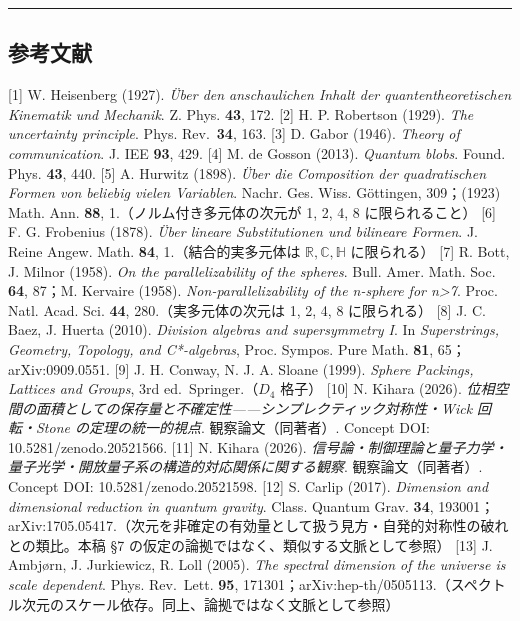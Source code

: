 \documentclass[
]{ltjsarticle}
\begin{document}
\begin{center}\rule{0.5\linewidth}{0.5pt}\end{center}

\subsection{参考文献}\label{ux53c2ux8003ux6587ux732e}

{[}1{]} W. Heisenberg (1927). \emph{Über den anschaulichen Inhalt der
quantentheoretischen Kinematik und Mechanik}. Z. Phys. \textbf{43}, 172.
{[}2{]} H. P. Robertson (1929). \emph{The uncertainty principle}. Phys.
Rev.~\textbf{34}, 163. {[}3{]} D. Gabor (1946). \emph{Theory of
communication}. J. IEE \textbf{93}, 429. {[}4{]} M. de Gosson (2013).
\emph{Quantum blobs}. Found. Phys. \textbf{43}, 440. {[}5{]} A. Hurwitz
(1898). \emph{Über die Composition der quadratischen Formen von beliebig
vielen Variablen}. Nachr. Ges. Wiss. Göttingen, 309；(1923) Math. Ann.
\textbf{88}, 1.（ノルム付き多元体の次元が 1, 2, 4, 8 に限られること）
{[}6{]} F. G. Frobenius (1878). \emph{Über lineare Substitutionen und
bilineare Formen}. J. Reine Angew. Math. \textbf{84},
1.（結合的実多元体は \(\mathbb{R},\mathbb{C},\mathbb{H}\) に限られる）
{[}7{]} R. Bott, J. Milnor (1958). \emph{On the parallelizability of the
spheres}. Bull. Amer. Math. Soc. \textbf{64}, 87；M. Kervaire (1958).
\emph{Non-parallelizability of the n-sphere for n\textgreater7}. Proc.
Natl. Acad. Sci. \textbf{44}, 280.（実多元体の次元は 1, 2, 4, 8
に限られる） {[}8{]} J. C. Baez, J. Huerta (2010). \emph{Division
algebras and supersymmetry I}. In \emph{Superstrings, Geometry,
Topology, and C*-algebras}, Proc. Sympos. Pure Math. \textbf{81},
65；arXiv:0909.0551. {[}9{]} J. H. Conway, N. J. A. Sloane (1999).
\emph{Sphere Packings, Lattices and Groups}, 3rd ed.~Springer.（\(D_4\)
格子） {[}10{]} N. Kihara (2026).
\emph{位相空間の面積としての保存量と不確定性------シンプレクティック対称性・Wick
回転・Stone の定理の統一的視点}. 観察論文（同著者）. Concept DOI:
10.5281/zenodo.20521566. {[}11{]} N. Kihara (2026).
\emph{信号論・制御理論と量子力学・量子光学・開放量子系の構造的対応関係に関する観察}.
観察論文（同著者）. Concept DOI: 10.5281/zenodo.20521598. {[}12{]} S.
Carlip (2017). \emph{Dimension and dimensional reduction in quantum
gravity}. Class. Quantum Grav. \textbf{34},
193001；arXiv:1705.05417.（次元を非確定の有効量として扱う見方・自発的対称性の破れとの類比。本稿
§7 の仮定の論拠ではなく、類似する文脈として参照） {[}13{]} J. Ambjørn,
J. Jurkiewicz, R. Loll (2005). \emph{The spectral dimension of the
universe is scale dependent}. Phys. Rev.~Lett. \textbf{95},
171301；arXiv:hep-th/0505113.（スペクトル次元のスケール依存。同上、論拠ではなく文脈として参照）
\end{document}
